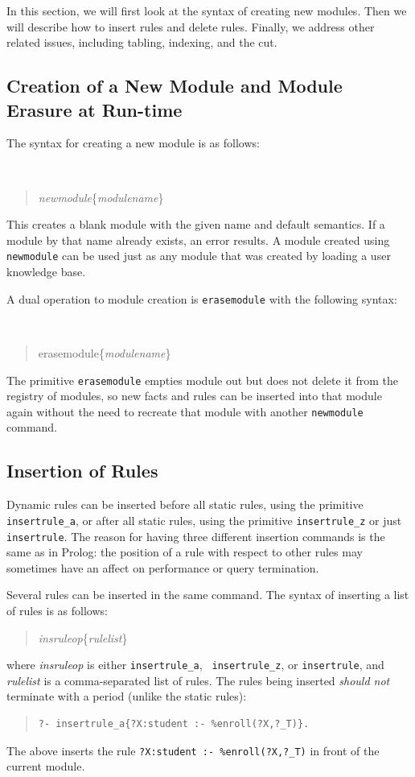 \documentclass[11pt]{article}
\begin{document}
In this section, we will first look at the syntax of creating new
modules.  Then we will describe how to insert rules and delete
rules. Finally, we address other related issues, including tabling,
indexing, and the cut.


\subsection{Creation of a New Module and Module Erasure at Run-time}


The syntax for creating a new module is as follows:
{\tt
\begin{quote}
\emph{newmodule}\{\emph{modulename}\}
\end{quote}
}
\noindent
This creates a blank module with the given name and default semantics.  If
a module by that name already exists, an error results.  A module created
using {\tt newmodule} can be used just as any module that
was created by loading a user knowledge base.

A dual operation to module creation
is \texttt{erasemodule} with the following syntax:
{\tt
\begin{quote}
erasemodule\{\emph{modulename}\}
\end{quote}
}
The primitive \texttt{erasemodule} empties module out but does not delete
it from the registry of modules, so new facts and rules can be inserted
into that module again without the need to recreate that module with
another \texttt{newmodule} command. 




\subsection{Insertion of Rules}
\label{sec-insertingrule}

Dynamic rules can be inserted before all static rules, using the
primitive {\tt insertrule\_a}, or after all static rules, using the
primitive {\tt insertrule\_z} or just {\tt insertrule}.
The reason for having three different insertion commands is the same as in
Prolog: the position of a rule with respect to other rules
may sometimes have an affect on
performance or query termination.

Several rules
can be inserted in the same command. The syntax of inserting a list of
rules is as follows:
\begin{quote}
\emph{insruleop}\{\emph{rulelist}\}
\end{quote}
\noindent
where \emph{insruleop} is either {\tt insertrule\_a}, {\tt
  insertrule\_z}, or {\tt insertrule},  and \emph{rulelist}  is a comma-separated
  list of rules.  The rules being inserted \emph{should not} terminate
  with a period (unlike the static rules):
\begin{quote}
\begin{verbatim}
?- insertrule_a{?X:student :- %enroll(?X,?_T)}.
\end{verbatim}
\end{quote}
The above inserts the rule {\tt ?X:student :- \verb|%|enroll(?X,?\_T)} in
front of the current module.
\end{document}
